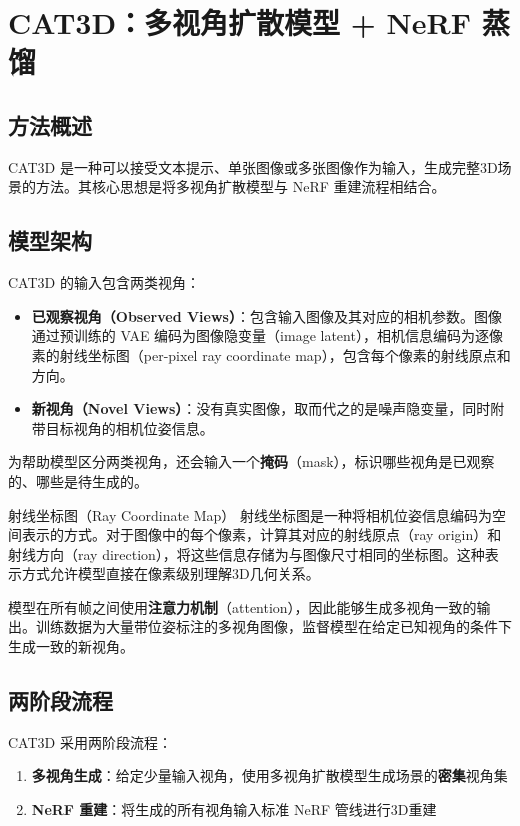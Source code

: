 \section{CAT3D：多视角扩散模型 + NeRF 蒸馏}

\subsection{方法概述}

CAT3D 是一种可以接受文本提示、单张图像或多张图像作为输入，生成完整3D场景的方法。其核心思想是将多视角扩散模型与 NeRF 重建流程相结合。

\subsection{模型架构}

CAT3D 的输入包含两类视角：

\begin{itemize}
    \item \textbf{已观察视角（Observed Views）}：包含输入图像及其对应的相机参数。图像通过预训练的 VAE 编码为图像隐变量（image latent），相机信息编码为逐像素的射线坐标图（per-pixel ray coordinate map），包含每个像素的射线原点和方向。
    \item \textbf{新视角（Novel Views）}：没有真实图像，取而代之的是噪声隐变量，同时附带目标视角的相机位姿信息。
\end{itemize}

为帮助模型区分两类视角，还会输入一个\textbf{掩码}（mask），标识哪些视角是已观察的、哪些是待生成的。

\begin{knowledgebox}{射线坐标图（Ray Coordinate Map）}
射线坐标图是一种将相机位姿信息编码为空间表示的方式。对于图像中的每个像素，计算其对应的射线原点（ray origin）和射线方向（ray direction），将这些信息存储为与图像尺寸相同的坐标图。这种表示方式允许模型直接在像素级别理解3D几何关系。
\end{knowledgebox}

模型在所有帧之间使用\textbf{注意力机制}（attention），因此能够生成多视角一致的输出。训练数据为大量带位姿标注的多视角图像，监督模型在给定已知视角的条件下生成一致的新视角。

\subsection{两阶段流程}

CAT3D 采用两阶段流程：

\begin{enumerate}
    \item \textbf{多视角生成}：给定少量输入视角，使用多视角扩散模型生成场景的\textbf{密集}视角集
    \item \textbf{NeRF 重建}：将生成的所有视角输入标准 NeRF 管线进行3D重建
\end{enumerate}

